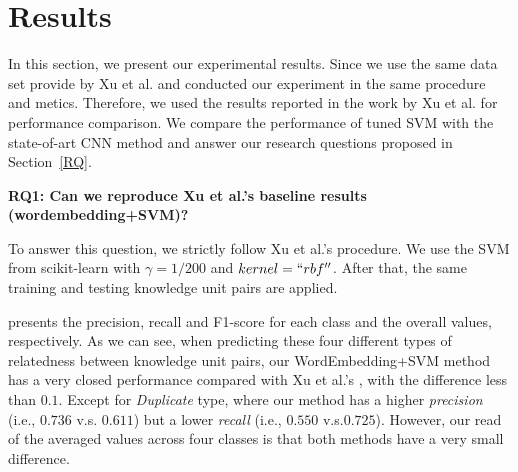 

\section{Results}
In this section, we present our experimental results. Since we use the same data set provide by Xu
et al.\cite{xu2016predicting} and conducted our experiment in the same procedure and metics. 
Therefore, we used the results reported in the work by Xu et al.\cite{xu2016predicting} for performance
comparison. We compare the performance of tuned SVM with the state-of-art CNN method and answer
our research questions proposed in Section~\ref{RQ}.

\begin{table}[!htp]
\centering
  \caption{Comparison of our baseline method with Xu et al's }
\label{tab:baseline}
\end{table}

\textbf{RQ1: Can we reproduce Xu et al.'s baseline results (wordembedding+SVM)?}

To answer this question, we strictly follow Xu et al.'s procedure\cite{xu2016predicting}. We 
use the SVM from scikit-learn with $\gamma = 1/200$ and $kernel= ``rbf''$. After that,
the same training and testing knowledge unit pairs are applied.

  presents the precision, recall and F1-score for each class and 
 the overall values, respectively. As we can see, 
 when predicting these four different types of relatedness between knowledge unit pairs,
 our WordEmbedding+SVM method has  a very closed performance compared with Xu et al.'s
, with the difference less than $0.1$.  Except for {\it Duplicate} type, where our method 
has a higher {\it precision} (i.e., $0.736$ v.s. $0.611$) but a lower {\it recall} (i.e., $0.550$ v.s.$0.725$).
However, our read of the averaged values across four classes is that both methods have
a very small difference.

